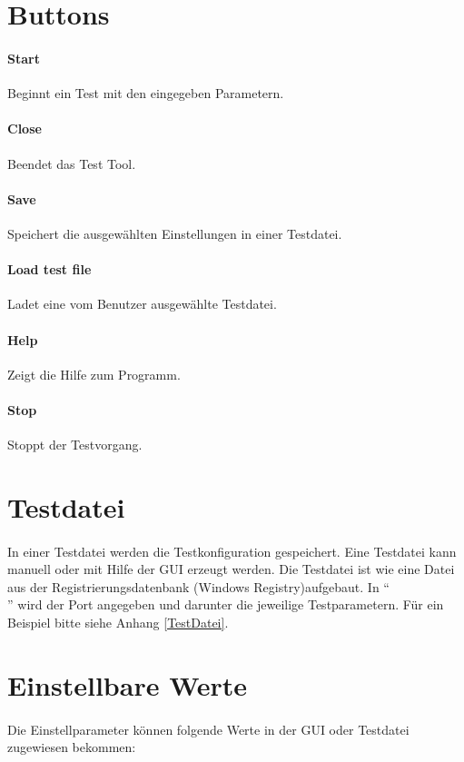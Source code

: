 \section{Buttons}
\paragraph{Start} Beginnt ein Test mit den eingegeben Parametern.
\paragraph{Close} Beendet das Test Tool.
\paragraph{Save} Speichert die ausgewählten Einstellungen in einer Testdatei.
\paragraph{Load test file} Ladet eine vom Benutzer ausgewählte Testdatei.
\paragraph{Help} Zeigt die Hilfe zum Programm.
\paragraph{Stop} Stoppt der Testvorgang.



\section{Testdatei}
\paragraph{}
In einer Testdatei werden die Testkonfiguration gespeichert. Eine Testdatei kann manuell oder mit Hilfe der GUI erzeugt werden. Die Testdatei ist wie eine Datei aus der Registrierungsdatenbank (Windows Registry)aufgebaut. In "`\[\]"' wird der Port angegeben und darunter die jeweilige Testparametern. Für ein Beispiel bitte siehe Anhang \ref{TestDatei}.


\section{Einstellbare Werte}
\paragraph{}
Die Einstellparameter können folgende Werte in der GUI oder Testdatei zugewiesen bekommen:
